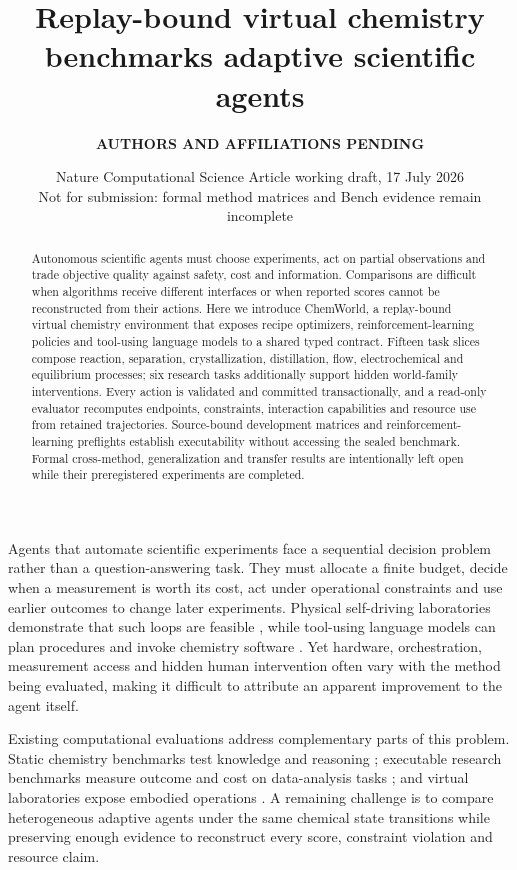 \documentclass[11pt]{article}
\title{\textbf{Replay-bound virtual chemistry benchmarks adaptive scientific agents}}
\author{\textbf{AUTHORS AND AFFILIATIONS PENDING}}
\date{Nature Computational Science Article working draft, 17 July 2026\\
\textcolor{pending}{Not for submission: formal method matrices and Bench evidence remain incomplete}}
\begin{document}
\maketitle

\begin{abstract}
Autonomous scientific agents must choose experiments, act on partial observations and trade objective quality against safety, cost and information. Comparisons are difficult when algorithms receive different interfaces or when reported scores cannot be reconstructed from their actions. Here we introduce ChemWorld, a replay-bound virtual chemistry environment that exposes recipe optimizers, reinforcement-learning policies and tool-using language models to a shared typed contract. Fifteen task slices compose reaction, separation, crystallization, distillation, flow, electrochemical and equilibrium processes; six research tasks additionally support hidden world-family interventions. Every action is validated and committed transactionally, and a read-only evaluator recomputes endpoints, constraints, interaction capabilities and resource use from retained trajectories. Source-bound development matrices and reinforcement-learning preflights establish executability without accessing the sealed benchmark. Formal cross-method, generalization and transfer results are intentionally left open while their preregistered experiments are completed.
\end{abstract}

Agents that automate scientific experiments face a sequential decision problem rather than a question-answering task. They must allocate a finite budget, decide when a measurement is worth its cost, act under operational constraints and use earlier outcomes to change later experiments. Physical self-driving laboratories demonstrate that such loops are feasible \citep{shields2021bo,szymanski2023alab,abolhasani2023sdl}, while tool-using language models can plan procedures and invoke chemistry software \citep{boiko2023coscientist,bran2024chemcrow}. Yet hardware, orchestration, measurement access and hidden human intervention often vary with the method being evaluated, making it difficult to attribute an apparent improvement to the agent itself.

Existing computational evaluations address complementary parts of this problem. Static chemistry benchmarks test knowledge and reasoning \citep{jablonka2024predictive,schneider2024chembench}; executable research benchmarks measure outcome and cost on data-analysis tasks \citep{chen2025scienceagentbench}; and virtual laboratories expose embodied operations \citep{beeler2024chemgymrl,li2025labutopia}. A remaining challenge is to compare heterogeneous adaptive agents under the same chemical state transitions while preserving enough evidence to reconstruct every score, constraint violation and resource claim.
\end{document}

